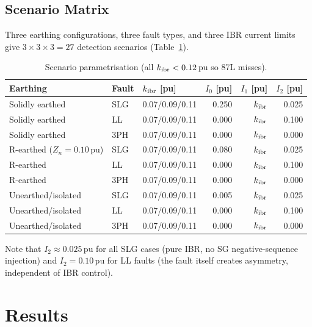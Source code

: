 \documentclass[11pt,a4paper]{article}
\begin{document}
\subsection{Scenario Matrix}

Three earthing configurations, three fault types, and three IBR current limits
give $3\times 3\times 3 = 27$ detection scenarios
(Table~\ref{tab:scenarios}).

\begin{table}[h!]
\centering
\caption{Scenario parametrisation (all $k_{\rm ibr} < 0.12$\,pu so 87L misses).}
\label{tab:scenarios}
\begin{tabular}{lllrrr}
\toprule
Earthing & Fault & $k_{\rm ibr}$ [pu] & $I_0$ [pu] & $I_1$ [pu] & $I_2$ [pu] \\
\midrule
Solidly earthed   & SLG & 0.07/0.09/0.11 & 0.250 & $k_{\rm ibr}$ & 0.025 \\
Solidly earthed   & LL  & 0.07/0.09/0.11 & 0.000 & $k_{\rm ibr}$ & 0.100 \\
Solidly earthed   & 3PH & 0.07/0.09/0.11 & 0.000 & $k_{\rm ibr}$ & 0.000 \\
\addlinespace
R-earthed ($Z_n=0.10$\,pu) & SLG & 0.07/0.09/0.11 & 0.080 & $k_{\rm ibr}$ & 0.025 \\
R-earthed & LL & 0.07/0.09/0.11 & 0.000 & $k_{\rm ibr}$ & 0.100 \\
R-earthed & 3PH & 0.07/0.09/0.11 & 0.000 & $k_{\rm ibr}$ & 0.000 \\
\addlinespace
Unearthed/isolated & SLG & 0.07/0.09/0.11 & 0.005 & $k_{\rm ibr}$ & 0.025 \\
Unearthed/isolated & LL  & 0.07/0.09/0.11 & 0.000 & $k_{\rm ibr}$ & 0.100 \\
Unearthed/isolated & 3PH & 0.07/0.09/0.11 & 0.000 & $k_{\rm ibr}$ & 0.000 \\
\bottomrule
\end{tabular}
\end{table}

Note that $I_2 \approx 0.025$\,pu for all SLG cases (pure IBR, no SG
negative-sequence injection) and $I_2 = 0.10$\,pu for LL faults (the fault
itself creates asymmetry, independent of IBR control).

\section{Results}
\end{document}
